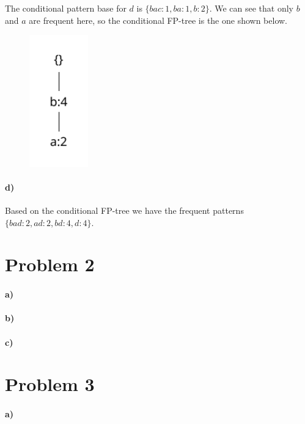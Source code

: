 \documentclass[12pt]{article}
\begin{document}
The conditional pattern base for \(d\) is \(\{bac:1, ba:1, b:2\}\). We can see that only \(b\) and \(a\) are
frequent here, so the conditional FP-tree is the one shown below.
\begin{figure}[H]
    \begin{center}
        \includegraphics[width=1in]{problem1c.pdf}
    \end{center}
\end{figure}

\paragraph{d)}

Based on the conditional FP-tree we have the frequent patterns \(\{bad:2, ad:2, bd:4, d:4\}\).

\section*{Problem 2}

\paragraph{a)}

\paragraph{b)}

\paragraph{c)}

\section*{Problem 3}

\paragraph{a)}
\end{document}
